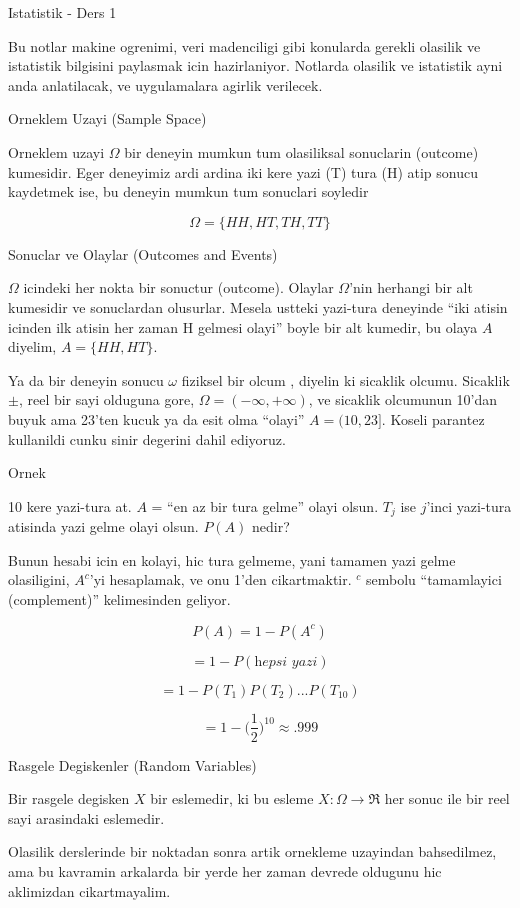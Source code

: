 \documentclass[12pt,fleqn]{article}
\begin{document}
Istatistik - Ders 1

Bu notlar makine ogrenimi, veri madenciligi gibi konularda gerekli olasilik
ve istatistik bilgisini paylasmak icin hazirlaniyor. Notlarda olasilik ve
istatistik ayni anda anlatilacak, ve uygulamalara agirlik verilecek. 

Orneklem Uzayi (Sample Space)

Orneklem uzayi $\Omega$ bir deneyin mumkun tum olasiliksal sonuclarin
(outcome) kumesidir. Eger deneyimiz ardi ardina iki kere yazi (T) tura (H)
atip sonucu kaydetmek ise, bu deneyin mumkun tum sonuclari soyledir

\[\Omega = \{HH,HT,TH,TT\} \]

Sonuclar ve Olaylar (Outcomes and Events)

$\Omega$ icindeki her nokta bir sonuctur (outcome). Olaylar $\Omega$'nin
herhangi bir alt kumesidir ve sonuclardan olusurlar. Mesela ustteki
yazi-tura deneyinde ``iki atisin icinden ilk atisin her zaman H gelmesi
olayi'' boyle bir alt kumedir, bu olaya $A$ diyelim, $A =
\{HH,HT\}$.

Ya da bir deneyin sonucu $\omega$ fiziksel bir olcum , diyelin ki sicaklik
olcumu. Sicaklik $\pm$, reel bir sayi olduguna gore, $\Omega = (-\infty,
+\infty)$, ve
sicaklik olcumunun 10'dan buyuk ama 23'ten kucuk ya da esit
olma ``olayi'' $A = (10,23]$. Koseli parantez kullanildi cunku sinir
degerini dahil ediyoruz. 

Ornek 

10 kere yazi-tura at. $A$ = ``en az bir tura gelme'' olayi olsun. $T_j$ ise
$j$'inci yazi-tura atisinda yazi gelme olayi olsun. $P(A)$ nedir? 

Bunun hesabi icin en kolayi, hic tura gelmeme, yani tamamen yazi gelme
olasiligini, $A^c$'yi hesaplamak, ve onu 1'den cikartmaktir. $^c$ sembolu
``tamamlayici (complement)'' kelimesinden geliyor.

\[ P(A) = 1 - P(A^c) \]

\[ = 1 - P(\textit{hepsi yazi}) \]

\[ = 1-P(T_1)P(T_2)...P(T_{10}) \]

\[ = 1 - \bigg(\frac{1}{2}\bigg)^{10} \approx .999 \]


Rasgele Degiskenler (Random Variables)

Bir rasgele degisken $X$ bir eslemedir, ki bu esleme $X: \Omega \to \Re$
her sonuc ile bir reel sayi arasindaki eslemedir. 

Olasilik derslerinde bir noktadan sonra artik ornekleme uzayindan
bahsedilmez, ama bu kavramin arkalarda bir yerde her zaman devrede oldugunu
hic aklimizdan cikartmayalim. 
\end{document}
